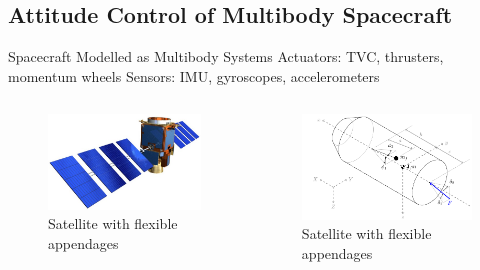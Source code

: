 \documentclass{beamer}
\begin{document}
\subsection{Attitude Control of Multibody Spacecraft}
\begin{frame}{Spacecraft Modelled as Multibody Systems}
Actuators: TVC, thrusters, momentum wheels
Sensors: IMU, gyroscopes, accelerometers
\begin{columns}
\begin{figure}
\includegraphics[width=\textwidth]{images/satellite.jpg}
\caption{Satellite with flexible appendages}
\end{figure}
\begin{figure}
\includegraphics[width=\textwidth]{images/rocket3.pdf}
\caption{Satellite with flexible appendages}
\end{figure}
\end{columns}
\end{frame}
\end{document}
